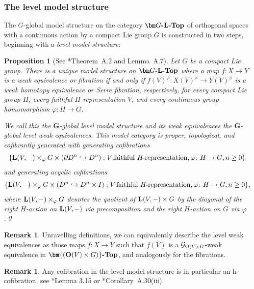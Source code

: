 \documentclass[reqno]{memo-l}
\theoremstyle{mythm}
\newtheorem{prop}[thm]{Proposition}
\theoremstyle{definition}
\newtheorem{rk}[thm]{Remark}
\numberwithin{equation}{section}
\renewcommand{\phi}{\varphi}
\newcommand{\cat}[1]{\textbf{\textup{#1}}}
\renewcommand{\O}{{\textup{O}}}
\begin{document}
\subsubsection{The level model structure}
The $G$-global model structure on the category $\cat{$\bm G$-$\cat{L}$-Top}$ of orthogonal spaces with a continuous action by a compact Lie group $G$ is constructed in two steps, beginning with a \emph{level model structure}:

\begin{prop}[See \cite{barrero2021}*{Theorem~A.2 and Lemma~A.7}]\label{prop:orth-lvl}
    Let $G$ be a compact Lie group. There is a unique model structure on $\cat{$\bm G$-$\cat{L}$-Top}$ where a map $f\colon X\to Y$ is a weak equivalence or fibration if and only if $f(V)^\phi\colon X(V)^\phi\to Y(V)^\phi$ is a weak homotopy equivalence or Serre fibration, respectively, for every compact Lie group $H$, every \emph{faithful} $H$-representation $V$, and every continuous group homomorphism $\phi\colon H\to G$.

    We call this the \emph{$\bm G$-global level model structure} and its weak equivalences the \emph{$\bm G$-global level weak equivalences}. This model category is proper, topological, and cofibrantly generated with generating cofibrations
    \[\hskip-0.6pt\hfuzz=0.6pt
        \{\cat{L}(V,-)\times_\phi G\times(\partial D^n\hookrightarrow D^n) : \text{$V$\kern1pt faithful $H$\kern-1pt-representation}, \phi\colon H\to G,n\ge0\}
    \]
    and generating acyclic cofibrations
    \[
        \{\cat{L}(V,-)\times_\phi G\times( D^n\hookrightarrow D^n\times I) : \text{$V$\kern1pt faithful $H$\kern-1pt-representation},\phi\colon H\to G,n\ge0\},
    \]
    where $\cat{L}(V,-)\times_\phi G$ denotes the quotient of $\cat{L}(V,-)\times G$ by the diagonal of the right $H$-action on $\cat{L}(V,-)$ via precomposition and the right $H$-action on $G$ via $\phi$.\qed
\end{prop}

\begin{rk}
    Unravelling definitions, we can equivalently describe the level weak equivalences as those maps $f\colon X\to Y$ such that $f(V)$ is a $\mathcal G_{\O(V),G}$-weak equivalence in $\cat{$\bm{(\O(V)\times G)}$-Top}$, and analogously for the fibrations.
\end{rk}

\begin{rk}\label{rk:level-cof-are-h-cof}
    Any cofibration in the level model structure is in particular an h-cofibration, see \cite{barrero2021}*{Lemma 3.15} or \cite{schwede2018global}*{Corollary~A.30(iii)}.
\end{rk}
\end{document}
